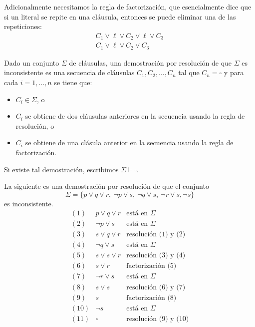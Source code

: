Adicionalmente necesitamos la regla de factorizaci\'on, que esencialmente dice
que si un literal se repite en una cl\'ausula, entonces se puede eliminar una de las repeticiones:
\[
\begin{array}{c}
C_1 \vee \ell \vee C_2 \vee \ell \vee C_3 \\ \hline
C_1 \vee \ell \vee C_2 \vee C_3
\end{array}
\]
\begin{definicion}
Dado un conjunto $\Sigma$ de cl\'ausulas, una demostraci\'on por resoluci\'on de que $\Sigma$
es inconsistente es una secuencia de cl\'ausulas $C_1,C_2,\ldots,C_n$ tal que
$C_n=\square$ y para cada $i=1,\ldots, n$ se tiene que:
\begin{itemize}
\item $C_i\in \Sigma$, o
\item $C_i$ se obtiene de dos cl\'ausulas anteriores en la secuencia usando la regla de resoluci\'on, o
\item $C_i$ se obtiene de una cl\'asula anterior en la secuencia usando la regla de factorizaci\'on.
\end{itemize}
Si existe tal demostraci\'on, escribimos $\Sigma\vdash \square$.
\end{definicion}

\begin{ejemplo}
La siguiente es una demostraci\'on por resoluci\'on de que el conjunto 
\[
\Sigma=\{p\vee q\vee r,\ \neg p \vee s,\ \neg q\vee s,\ \neg r\vee s, \neg s\}
\]
es inconsistente.
\[
\begin{array}{cll}
(1) & p\vee q\vee r & \text{est\'a en }\Sigma \\
(2) & \neg p\vee s & \text{est\'a en }\Sigma\\
(3) & s\vee q\vee r & \text{resoluci\'on (1) y (2)} \\
(4) & \neg q \vee s & \text{est\'a en }\Sigma \\
(5) & s \vee s \vee r & \text{resoluci\'on (3) y (4)}\\
(6) & s \vee r & \text{factorizaci\'on (5)} \\
(7) & \neg r \vee s & \text{est\'a en }\Sigma \\
(8) & s \vee s & \text{resoluci\'on (6) y (7)} \\
(9) & s & \text{factorizaci\'on (8)} \\
(10) & \neg s & \text{est\'a en }\Sigma \\
(11) & \square & \text{resoluci\'on (9) y (10)}
\end{array}
\]
\end{ejemplo}

